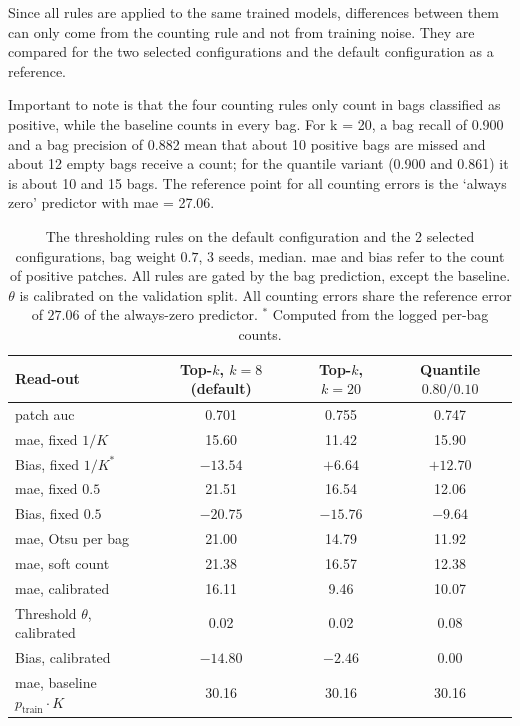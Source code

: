 \documentclass[12pt,parskip = half, DIV=classic,listof=totoc]{scrartcl}
\begin{document}
			Since all rules are applied to the same trained models, differences between them can only come 
			from the counting rule and not from training noise. They are compared for the two selected 
			configurations and the default configuration as a reference.

			Important to note is that the four counting rules only count in bags classified as positive, 
			while the baseline counts in every bag. For k = 20, a bag recall of 0.900 and a 
			bag precision of 0.882 mean that about 10 positive bags are missed and about 12 
			empty bags receive a count; for the quantile variant (0.900 and 0.861) it is about 
			10 and 15 bags. The reference point for all counting errors is the ‘always zero’ predictor with
			\ac{mae} = 27.06.

			\begin{table}[htbp]
				\centering
				\footnotesize
				\begin{tabular}{@{}lccc@{}}
					\toprule
					Read-out & Top-$k$, $k=8$ (default) & Top-$k$, $k=20$ & Quantile $0.80/0.10$ \\
					\midrule
					patch \acs*{auc} & 0.701 & 0.755& 0.747  \\
					\midrule
					\acs*{mae}, fixed $1/K$ & 15.60 & 11.42 & 15.90 \\
					Bias, fixed $1/K^{\ast}$ & $-13.54$ & $+6.64$ & $+12.70$ \\
					\midrule
					\acs*{mae}, fixed $0.5$ & 21.51 & 16.54 & 12.06 \\
					Bias, fixed $0.5$ & $-20.75$ & $-15.76$ & $-9.64$ \\
					\midrule
					\acs*{mae}, Otsu per bag & 21.00 & 14.79 & 11.92 \\
					\acs*{mae}, soft count & 21.38 & 16.57 & 12.38 \\
					\midrule
					\acs*{mae}, calibrated & 16.11 & 9.46 & 10.07 \\
					Threshold $\theta$, calibrated & 0.02 & 0.02 & 0.08  \\
					Bias, calibrated & $-14.80$ & $-2.46$ & $0.00$ \\
					\midrule
					\acs*{mae}, baseline $p_{\text{train}}\cdot K$ & 30.16 & 30.16 & 30.16 \\
					\bottomrule
				\end{tabular}
				\caption[The thresholding rules on the default configuration and the 2 selected configurations, bag weight $0.7$, 3 seeds, median]{The thresholding rules on the default configuration and the 2 selected configurations, bag weight $0.7$, 3 seeds,
				median. \Ac{mae} and bias refer to the count of positive patches. All rules
				are gated by the bag prediction, except the baseline.
				$\theta$ is calibrated on the validation split. All counting errors share the reference error of $27.06$ of the
				always-zero predictor. $^{\ast}$ Computed from the logged per-bag counts.}
				\label{tab:clam_selected}
			\end{table}
\end{document}
